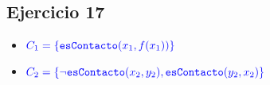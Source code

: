 \documentclass[10pt,a4paper]{article}
\begin{document}
\subsection{Ejercicio 17}
\begin{itemize}
        \item ${\color{blue}C_1 = \{\texttt{esContacto}(x_1,f(x_1))\}}$
        \item ${\color{blue}C_2 = \{ \lnot \texttt{esContacto}(x_2,y_2), \texttt{esContacto}(y_2,x_2)\}}$
\end{itemize}
\end{document}
